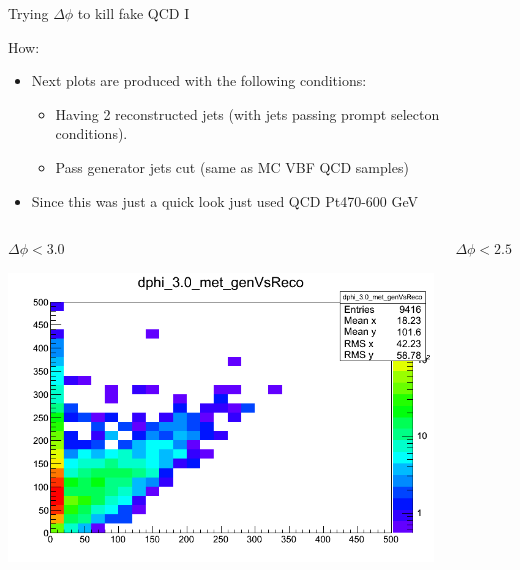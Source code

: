 \documentclass[8pt]{beamer}
\begin{document}
\begin{frame}{Trying $\Delta\phi$ to kill fake QCD I}
 
\begin{block}{How:}

  \begin{itemize}
    \item Next plots are produced with the following conditions:
    \begin{itemize}
      \item Having 2 reconstructed jets (with jets passing prompt selecton conditions).
      \item Pass generator jets cut (same as MC VBF QCD samples)
    \end{itemize}
    \item Since this was just a quick look just used QCD Pt470-600 GeV
  \end{itemize}

\end{block}

\begin{columns}

\begin{block}{$\Delta\phi<3.0$}
 
\centering
\includegraphics[width=\linewidth]{img/dphi_3p0_met_genVsReco.png} 
 
\end{block}

\begin{block}{$\Delta\phi<2.5$}
 

\end{block}
\end{columns}
\end{frame}
\end{document}
